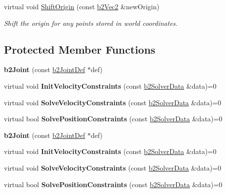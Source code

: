 \begin{DoxyCompactItemize}
\mbox{\label{classb2Joint_a7804f649e993dc0fd9ae47fde5601f90}} 
virtual void \hyperlink{classb2Joint_a7804f649e993dc0fd9ae47fde5601f90}{Shift\+Origin} (const \hyperlink{structb2Vec2}{b2\+Vec2} \&new\+Origin)
\begin{DoxyCompactList}\small\item\em Shift the origin for any points stored in world coordinates. \end{DoxyCompactList}\end{DoxyCompactItemize}
\subsection*{Protected Member Functions}
\begin{DoxyCompactItemize}
\item 
\mbox{\label{classb2Joint_a8d6cce91546335fe95325d5e29c06a19}} 
{\bfseries b2\+Joint} (const \hyperlink{structb2JointDef}{b2\+Joint\+Def} $\ast$def)
\item 
\mbox{\label{classb2Joint_a599c013de5514e02684b958b31dd76a4}} 
virtual void {\bfseries Init\+Velocity\+Constraints} (const \hyperlink{structb2SolverData}{b2\+Solver\+Data} \&data)=0
\item 
\mbox{\label{classb2Joint_ad302c8d02efcfe934158de0dc429348d}} 
virtual void {\bfseries Solve\+Velocity\+Constraints} (const \hyperlink{structb2SolverData}{b2\+Solver\+Data} \&data)=0
\item 
\mbox{\label{classb2Joint_af767ac9aa494bd15cdf83dfe3e487d9c}} 
virtual bool {\bfseries Solve\+Position\+Constraints} (const \hyperlink{structb2SolverData}{b2\+Solver\+Data} \&data)=0
\item 
\mbox{\label{classb2Joint_a8d6cce91546335fe95325d5e29c06a19}} 
{\bfseries b2\+Joint} (const \hyperlink{structb2JointDef}{b2\+Joint\+Def} $\ast$def)
\item 
\mbox{\label{classb2Joint_a599c013de5514e02684b958b31dd76a4}} 
virtual void {\bfseries Init\+Velocity\+Constraints} (const \hyperlink{structb2SolverData}{b2\+Solver\+Data} \&data)=0
\item 
\mbox{\label{classb2Joint_ad302c8d02efcfe934158de0dc429348d}} 
virtual void {\bfseries Solve\+Velocity\+Constraints} (const \hyperlink{structb2SolverData}{b2\+Solver\+Data} \&data)=0
\item 
\mbox{\label{classb2Joint_af767ac9aa494bd15cdf83dfe3e487d9c}} 
virtual bool {\bfseries Solve\+Position\+Constraints} (const \hyperlink{structb2SolverData}{b2\+Solver\+Data} \&data)=0
\end{DoxyCompactItemize}
